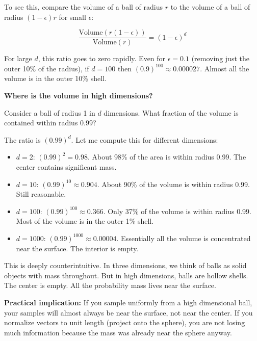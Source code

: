 To see this, compare the volume of a ball of radius $r$ to the volume of a ball of radius $(1 - \epsilon)r$ for small $\epsilon$:

\begin{equation}
\frac{\text{Volume}(r(1-\epsilon))}{\text{Volume}(r)} = (1-\epsilon)^d
\end{equation}

For large $d$, this ratio goes to zero rapidly. Even for $\epsilon = 0.1$ (removing just the outer 10\% of the radius), if $d = 100$ then $(0.9)^{100} \approx 0.000027$. Almost all the volume is in the outer 10\% shell.

\vspace{1.5em}

\begin{examplebox}
\textbf{Where is the volume in high dimensions?}

\vspace{0.5em}

Consider a ball of radius 1 in $d$ dimensions. What fraction of the volume is contained within radius $0.99$?

\vspace{0.5em}

The ratio is $(0.99)^d$. Let me compute this for different dimensions:

\begin{itemize}
\item $d = 2$: $(0.99)^2 = 0.98$. About 98\% of the area is within radius 0.99. The center contains significant mass.

\item $d = 10$: $(0.99)^{10} \approx 0.904$. About 90\% of the volume is within radius 0.99. Still reasonable.

\item $d = 100$: $(0.99)^{100} \approx 0.366$. Only 37\% of the volume is within radius 0.99. Most of the volume is in the outer 1\% shell.

\item $d = 1000$: $(0.99)^{1000} \approx 0.00004$. Essentially all the volume is concentrated near the surface. The interior is empty.
\end{itemize}

\vspace{0.5em}

This is deeply counterintuitive. In three dimensions, we think of balls as solid objects with mass throughout. But in high dimensions, balls are hollow shells. The center is empty. All the probability mass lives near the surface.

\vspace{0.5em}

\textbf{Practical implication:} If you sample uniformly from a high dimensional ball, your samples will almost always be near the surface, not near the center. If you normalize vectors to unit length (project onto the sphere), you are not losing much information because the mass was already near the sphere anyway.
\end{examplebox}

